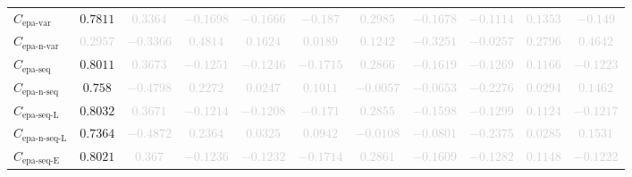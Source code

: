 \documentclass{standalone}
\newcommand{\epavariantname}{\text{epa-var}}
\newcommand{\epavariant}{C_{\epavariantname}}
\newcommand{\epanormvariantname}{\text{epa-n-var}}
\newcommand{\epanormvariant}{C_{\epanormvariantname}}
\newcommand{\epasequencename}{\text{epa-seq}}
\newcommand{\epasequence}{C_{\epasequencename}}
\newcommand{\epanormsequencename}{\text{epa-n-seq}}
\newcommand{\epanormsequence}{C_{\epanormsequencename}}
\newcommand{\epasequencelname}{\text{epa-seq-L}}
\newcommand{\epasequencel}{C_{\epasequencelname}}
\newcommand{\epanormsequencelname}{\text{epa-n-seq-L}}
\newcommand{\epanormsequencel}{C_{\epanormsequencelname}}
\newcommand{\epasequenceename}{\text{epa-seq-E}}
\newcommand{\epasequencee}{C_{\epasequenceename}}
\begin{document}
\begin{tabular}{lcccccccccc}
$\epavariant$ & $0.7811$ & \textcolor{lightgray}{$0.3364$} & \textcolor{lightgray}{$-0.1698$} & \textcolor{lightgray}{$-0.1666$} & \textcolor{lightgray}{$-0.187$} & \textcolor{lightgray}{$0.2985$} & \textcolor{lightgray}{$-0.1678$} & \textcolor{lightgray}{$-0.1114$} & \textcolor{lightgray}{$0.1353$} & \textcolor{lightgray}{$-0.149$} \\ 
$\epanormvariant$ & \textcolor{lightgray}{$0.2957$} & \textcolor{lightgray}{$-0.3366$} & \textcolor{lightgray}{$0.4814$} & \textcolor{lightgray}{$0.1624$} & \textcolor{lightgray}{$0.0189$} & \textcolor{lightgray}{$0.1242$} & \textcolor{lightgray}{$-0.3251$} & \textcolor{lightgray}{$-0.0257$} & \textcolor{lightgray}{$0.2796$} & \textcolor{lightgray}{$0.4642$} \\ 
$\epasequence$ & $0.8011$ & \textcolor{lightgray}{$0.3673$} & \textcolor{lightgray}{$-0.1251$} & \textcolor{lightgray}{$-0.1246$} & \textcolor{lightgray}{$-0.1715$} & \textcolor{lightgray}{$0.2866$} & \textcolor{lightgray}{$-0.1619$} & \textcolor{lightgray}{$-0.1269$} & \textcolor{lightgray}{$0.1166$} & \textcolor{lightgray}{$-0.1223$} \\ 
$\epanormsequence$ & $0.758$ & \textcolor{lightgray}{$-0.4798$} & \textcolor{lightgray}{$0.2272$} & \textcolor{lightgray}{$0.0247$} & \textcolor{lightgray}{$0.1011$} & \textcolor{lightgray}{$-0.0057$} & \textcolor{lightgray}{$-0.0653$} & \textcolor{lightgray}{$-0.2276$} & \textcolor{lightgray}{$0.0294$} & \textcolor{lightgray}{$0.1462$} \\ 
$\epasequencel$ & $0.8032$ & \textcolor{lightgray}{$0.3671$} & \textcolor{lightgray}{$-0.1214$} & \textcolor{lightgray}{$-0.1208$} & \textcolor{lightgray}{$-0.171$} & \textcolor{lightgray}{$0.2855$} & \textcolor{lightgray}{$-0.1598$} & \textcolor{lightgray}{$-0.1299$} & \textcolor{lightgray}{$0.1124$} & \textcolor{lightgray}{$-0.1217$} \\ 
$\epanormsequencel$ & $0.7364$ & \textcolor{lightgray}{$-0.4872$} & \textcolor{lightgray}{$0.2364$} & \textcolor{lightgray}{$0.0325$} & \textcolor{lightgray}{$0.0942$} & \textcolor{lightgray}{$-0.0108$} & \textcolor{lightgray}{$-0.0801$} & \textcolor{lightgray}{$-0.2375$} & \textcolor{lightgray}{$0.0285$} & \textcolor{lightgray}{$0.1531$} \\ 
$\epasequencee$ & $0.8021$ & \textcolor{lightgray}{$0.367$} & \textcolor{lightgray}{$-0.1236$} & \textcolor{lightgray}{$-0.1232$} & \textcolor{lightgray}{$-0.1714$} & \textcolor{lightgray}{$0.2861$} & \textcolor{lightgray}{$-0.1609$} & \textcolor{lightgray}{$-0.1282$} & \textcolor{lightgray}{$0.1148$} & \textcolor{lightgray}{$-0.1222$} \\ 

\end{tabular}
\end{document}
